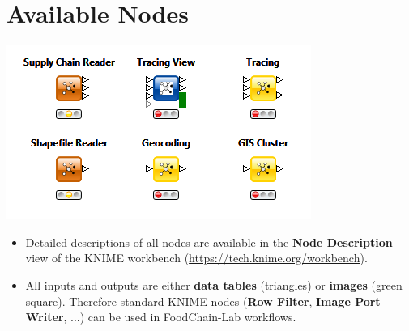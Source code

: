 \documentclass{beamer}
\begin{document}
\section{Available Nodes}
\begin{frame}
	\begin{center}
  		\includegraphics[height=0.4\textheight]{1.png}
	\end{center}
	\begin{itemize}
		\item Detailed descriptions of all nodes are available in the \textbf{Node Description} view of the KNIME workbench (\url{https://tech.knime.org/workbench}).
		\item All inputs and outputs are either \textbf{data tables} (triangles) or \textbf{images} (green square). Therefore standard KNIME nodes (\textbf{Row Filter}, \textbf{Image Port Writer}, ...) can be used in FoodChain-Lab workflows.		
	\end{itemize}
\end{frame}
 
\end{document}
